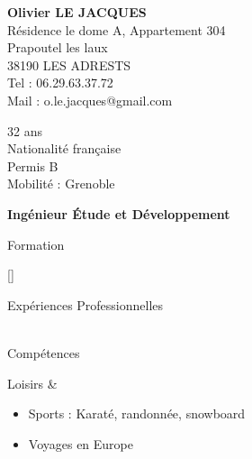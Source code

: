 \documentclass{cv}
\newlength{\espaceChamps}
\newcommand{\educationdir}{french/education}
\newcommand{\experiencedir}{french/experience}
\newcommand{\skilldir}{french/skill}
\newlength{\firstcolumnwidth}%
\begin{document}
\begin{chapeau}
	\begin{adresse}
		\textbf{Olivier LE JACQUES}\\
		Résidence le dome A, Appartement 304\\
		Prapoutel les  laux\\
		38190 LES ADRESTS\\
		Tel : 06.29.63.37.72\\
		Mail : o.le.jacques@gmail.com\\
	\end{adresse}
	\begin{etatcivil}
		32 ans \\
        Nationalité française \\
		Permis B \\
        Mobilité : Grenoble \\
	\end{etatcivil}
\end{chapeau}

\vspace{0.2cm}

\begin{center}
	\textbf{\huge{Ingénieur Étude et Développement}}
\end{center}

\vspace{0.2cm}

\begin{rubriquetableau}[\firstcolumnwidth]{Formation}
    
    
    
    
    
    [\espaceChamps] \\
\end{rubriquetableau}

\begin{rubriquetableau}[\firstcolumnwidth]{Expériences Professionnelles}
     \\
	 \\
\end{rubriquetableau}

\newpage

\begin{rubriquetableau}[\firstcolumnwidth]{Compétences}
    
	
	
\end{rubriquetableau}
    
\begin{rubriquetableau}[\firstcolumnwidth]{Loisirs}
	& \begin{itemize}
		\item Sports : Karaté, randonnée, snowboard
        \item Voyages en Europe
	\end{itemize}\\
\end{rubriquetableau}
\end{document}
